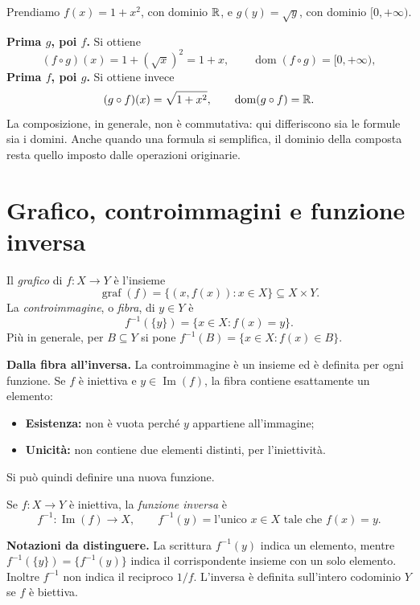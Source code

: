 \begin{esempio}
Prendiamo $f(x)=1+x^2$, con dominio $\mathbb{R}$, e $g(y)=\sqrt y$, con dominio $[0,+\infty)$.

\textbf{Prima $g$, poi $f$.} Si ottiene
\[
(f\circ g)(x)=1+(\sqrt x)^2=1+x,
\qquad \operatorname{dom}(f\circ g)=[0,+\infty),
\]
\textbf{Prima $f$, poi $g$.} Si ottiene invece
\[
(g\circ f)(x)=\sqrt{1+x^2},
\qquad \operatorname{dom}(g\circ f)=\mathbb{R}.
\]
La composizione, in generale, non è commutativa: qui differiscono sia le formule sia i domini. Anche quando una formula si semplifica, il dominio della composta resta quello imposto dalle operazioni originarie.
\end{esempio}

\section{Grafico, controimmagini e funzione inversa}

\begin{definizione}
Il \emph{grafico} di $f\colon X\to Y$ è l'insieme
\[
\operatorname{graf}(f)=\{(x,f(x)):x\in X\}\subseteq X\times Y.
\]
La \emph{controimmagine}, o \emph{fibra}, di $y\in Y$ è
\[
f^{-1}(\{y\})=\{x\in X:f(x)=y\}.
\]
Più in generale, per $B\subseteq Y$ si pone $f^{-1}(B)=\{x\in X:f(x)\in B\}$.
\end{definizione}

\textbf{Dalla fibra all'inversa.} La controimmagine è un insieme ed è definita per ogni funzione. Se $f$ è iniettiva e $y\in\operatorname{Im}(f)$, la fibra contiene esattamente un elemento:
\begin{itemize}
  \item \textbf{Esistenza:} non è vuota perché $y$ appartiene all'immagine;
  \item \textbf{Unicità:} non contiene due elementi distinti, per l'iniettività.
\end{itemize}
Si può quindi definire una nuova funzione.

\begin{definizione}
Se $f\colon X\to Y$ è iniettiva, la \emph{funzione inversa} è
\[
f^{-1}\colon\operatorname{Im}(f)\longrightarrow X,
\qquad f^{-1}(y)=\text{l'unico }x\in X\text{ tale che }f(x)=y.
\]
\end{definizione}

\textbf{Notazioni da distinguere.} La scrittura $f^{-1}(y)$ indica un elemento, mentre $f^{-1}(\{y\})=\{f^{-1}(y)\}$ indica il corrispondente insieme con un solo elemento. Inoltre $f^{-1}$ non indica il reciproco $1/f$. L'inversa è definita sull'intero codominio $Y$ se $f$ è biettiva.

